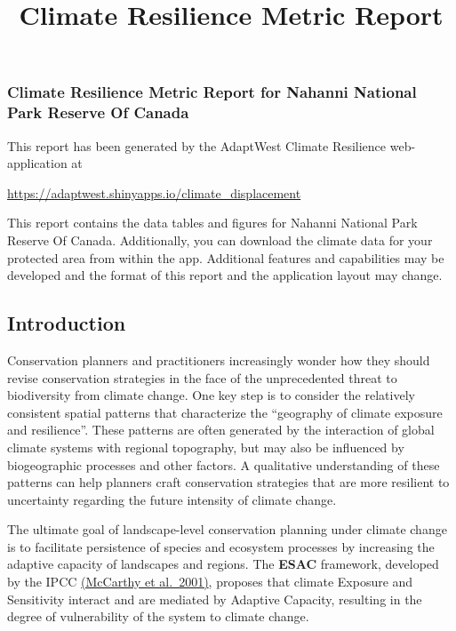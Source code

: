 \documentclass[
]{article}
\title{Climate Resilience Metric Report}
\author{}
\date{\vspace{-2.5em}}
\begin{document}
\maketitle

\hypertarget{climate-resilience-metric-report-for-nahanni-national-park-reserve-of-canada}{%
\subsubsection{Climate Resilience Metric Report for Nahanni National
Park Reserve Of
Canada}\label{climate-resilience-metric-report-for-nahanni-national-park-reserve-of-canada}}

This report has been generated by the AdaptWest Climate Resilience
web-application at

\url{https://adaptwest.shinyapps.io/climate_displacement}

This report contains the data tables and figures for Nahanni National
Park Reserve Of Canada. Additionally, you can download the climate data
for your protected area from within the app. Additional features and
capabilities may be developed and the format of this report and the
application layout may change.

\hypertarget{introduction}{%
\subsection{Introduction}\label{introduction}}

Conservation planners and practitioners increasingly wonder how they
should revise conservation strategies in the face of the unprecedented
threat to biodiversity from climate change. One key step is to consider
the relatively consistent spatial patterns that characterize the
``geography of climate exposure and resilience''. These patterns are
often generated by the interaction of global climate systems with
regional topography, but may also be influenced by biogeographic
processes and other factors. A qualitative understanding of these
patterns can help planners craft conservation strategies that are more
resilient to uncertainty regarding the future intensity of climate
change.

The ultimate goal of landscape-level conservation planning under climate
change is to facilitate persistence of species and ecosystem processes
by increasing the adaptive capacity of landscapes and regions. The
\textbf{ESAC} framework, developed by the IPCC
\href{https://www.ipcc.ch/ipccreports/tar/wg2/pdf/wg2TARfrontmatter.pdf}{(McCarthy
et al.~2001)}, proposes that climate Exposure and Sensitivity interact
and are mediated by Adaptive Capacity, resulting in the degree of
vulnerability of the system to climate change.
\end{document}
